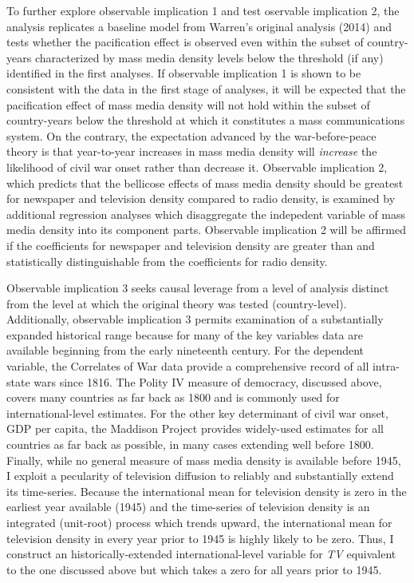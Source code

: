\documentclass[11pt,article,oneside]{memoir}
\begin{document}
To further explore observable implication 1 and test oservable
implication 2, the analysis replicates a baseline model from Warren's
original analysis (2014) and tests whether the pacification effect is
observed even within the subset of country-years characterized by mass
media density levels below the threshold (if any) identified in the
first analyses. If observable implication 1 is shown to be consistent
with the data in the first stage of analyses, it will be expected that
the pacification effect of mass media density will not hold within the
subset of country-years below the threshold at which it constitutes a
mass communications system. On the contrary, the expectation advanced by
the war-before-peace theory is that year-to-year increases in mass media
density will \emph{increase} the likelihood of civil war onset rather
than decrease it. Observable implication 2, which predicts that the
bellicose effects of mass media density should be greatest for newspaper
and television density compared to radio density, is examined by
additional regression analyses which disaggregate the indepedent
variable of mass media density into its component parts. Observable
implication 2 will be affirmed if the coefficients for newspaper and
television density are greater than and statistically distinguishable
from the coefficients for radio density.

Observable implication 3 seeks causal leverage from a level of analysis
distinct from the level at which the original theory was tested
(country-level). Additionally, observable implication 3 permits
examination of a substantially expanded historical range because for
many of the key variables data are available beginning from the early
nineteenth century. For the dependent variable, the Correlates of War
data provide a comprehensive record of all intra-state wars since 1816.
The Polity IV measure of democracy, discussed above, covers many
countries as far back as 1800 and is commonly used for
international-level estimates. For the other key determinant of civil
war onset, GDP per capita, the Maddison Project provides widely-used
estimates for all countries as far back as possible, in many cases
extending well before 1800. Finally, while no general measure of mass
media density is available before 1945, I exploit a pecularity of
television diffusion to reliably and substantially extend its
time-series. Because the international mean for television density is
zero in the earliest year available (1945) and the time-series of
television density is an integrated (unit-root) process which trends
upward, the international mean for television density in every year
prior to 1945 is highly likely to be zero. Thus, I construct an
historically-extended international-level variable for \emph{TV}
equivalent to the one discussed above but which takes a zero for all
years prior to 1945.
\end{document}
